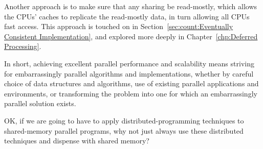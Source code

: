 Another approach is to make sure that any sharing be read-mostly, which
allows the CPUs' caches to replicate the read-mostly data, in turn
allowing all CPUs fast access.
This approach is touched on in
Section~\ref{sec:count:Eventually Consistent Implementation},
and explored more deeply in
Chapter~\ref{chp:Deferred Processing}.

In short, achieving excellent parallel performance and scalability means
striving for embarrassingly parallel algorithms and implementations,
whether by careful choice of data structures and algorithms, use of
existing parallel applications and environments, or transforming the
problem into one for which an embarrassingly parallel solution exists.

\QuickQuiz{}
	OK, if we are going to have to apply distributed-programming
	techniques to shared-memory parallel programs, why not just
	always use these distributed techniques and dispense with
	shared memory?
 \QuickQuizEnd
